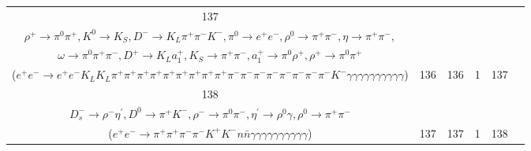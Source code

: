 \documentclass[landscape]{article}
\begin{document}
\begin{table}[htbp!]
\begin{tabular}{|c|c|c|c|c|c|}
\hline
137 & \makecell{ $ 
e^{+} e^{-} \rightarrow \Upsilon(4S) ,
\Upsilon(4S) \rightarrow B^{0} \bar{B}^{0} ,
B^{0} \rightarrow \rho^{0} \pi^{-} \rho^{+} \rho^{+} K^{0} D^{-} ,
\bar{B}^{0} \rightarrow \pi^{0} \rho^{0} \pi^{-} \eta \omega D^{+} ,
\rho^{0} \rightarrow \pi^{+} \pi^{-} ,
\rho^{+} \rightarrow \pi^{0} \pi^{+} ,
$ \\ $
\rho^{+} \rightarrow \pi^{0} \pi^{+} ,
K^{0} \rightarrow K_{S} ,
D^{-} \rightarrow K_{L} \pi^{+} \pi^{-} K^{-} ,
\pi^{0} \rightarrow e^{+} e^{-} ,
\rho^{0} \rightarrow \pi^{+} \pi^{-} ,
\eta \rightarrow \pi^{+} \pi^{-} ,
$ \\ $
\omega \rightarrow \pi^{0} \pi^{+} \pi^{-} ,
D^{+} \rightarrow K_{L} a_{1}^{+} ,
K_{S} \rightarrow \pi^{+} \pi^{-} ,
a_{1}^{+} \rightarrow \pi^{0} \rho^{+} ,
\rho^{+} \rightarrow \pi^{0} \pi^{+} 
$ \\ ($
e^{+} e^{-} \rightarrow e^{+} e^{-} K_{L} K_{L} \pi^{+} \pi^{+} \pi^{+} \pi^{+} \pi^{+} \pi^{+} \pi^{+} \pi^{+} \pi^{+} \pi^{-} \pi^{-} \pi^{-} \pi^{-} \pi^{-} \pi^{-} \pi^{-} \pi^{-} K^{-} \gamma \gamma \gamma \gamma \gamma \gamma \gamma \gamma \gamma \gamma 
$) } & 136 & 136 & 1 & 137 \\
\hline
138 & \makecell{ $ 
e^{+} e^{-} \rightarrow \Upsilon(4S) ,
\Upsilon(4S) \rightarrow B^{0} \bar{B}^{0} ,
B^{0} \rightarrow \pi^{0} \pi^{0} K^{+} D_{s}^{*-} ,
\bar{B}^{0} \rightarrow D^{*0} n \bar{n} ,
D_{s}^{*-} \rightarrow D_{s}^{-} \gamma ,
D^{*0} \rightarrow \pi^{0} D^{0} ,
$ \\ $
D_{s}^{-} \rightarrow \rho^{-} \eta^{\prime} ,
D^{0} \rightarrow \pi^{+} K^{-} ,
\rho^{-} \rightarrow \pi^{0} \pi^{-} ,
\eta^{\prime} \rightarrow \rho^{0} \gamma ,
\rho^{0} \rightarrow \pi^{+} \pi^{-} 
$ \\ ($
e^{+} e^{-} \rightarrow \pi^{+} \pi^{+} \pi^{-} \pi^{-} K^{+} K^{-} n \bar{n} \gamma \gamma \gamma \gamma \gamma \gamma \gamma \gamma \gamma \gamma 
$) } & 137 & 137 & 1 & 138 \\
\hline
\end{tabular}
\end{table}

\clearpage
\end{document}
